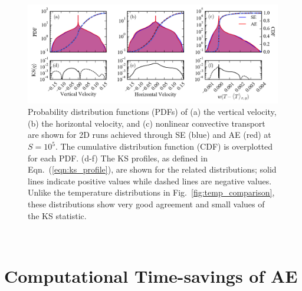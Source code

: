 \documentclass[aps, pre, onecolumn, nofootinbib, notitlepage, groupedaddress, amsfonts, amssymb, amsmath, longbibliography]{revtex4-1}
\begin{document}
\begin{figure}[b!]
\includegraphics[width=\textwidth]{./figs/pdf_comparison.png}
\caption{Probability distribution functions (PDFs) of (a) the vertical velocity, (b) the horizontal velocity, and (c) nonlinear
convective transport are shown for 2D runs achieved through SE (blue) and AE (red)
at $S = 10^{5}$.  The cumulative distribution function (CDF) is overplotted for each PDF. 
(d-f) The KS profiles, as defined in Eqn.~(\ref{eqn:ks_profile}),
are shown for the related distributions; solid lines indicate positive values
while dashed lines are negative values. Unlike the temperature distributions in
Fig.~\ref{fig:temp_comparison}, these distributions
show very good agreement and small values of the KS statistic.
\label{fig:pdf_comparison} }
\end{figure}


\newpage$\,$\newpage
\section{Computational Time-savings of AE}
\label{sec:speedups}
\end{document}
